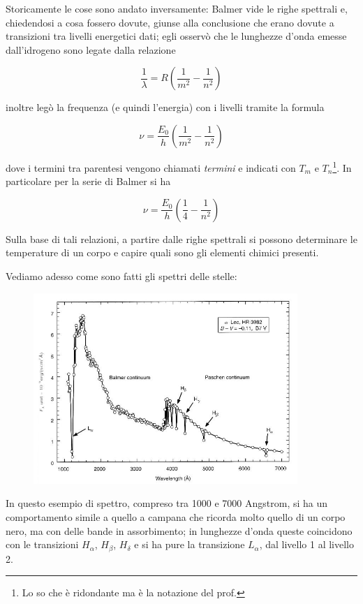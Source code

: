 Storicamente le cose sono andato inversamente: Balmer vide le righe spettrali e, chiedendosi a cosa fossero dovute, giunse alla conclusione che erano dovute a transizioni tra livelli energetici dati; egli osservò che le lunghezze d'onda emesse dall'idrogeno sono legate dalla relazione

$$\frac{1}{\lambda}=R \left( \frac{1}{m^2} - \frac{1}{n^2} \right)$$

inoltre legò la frequenza (e quindi l'energia) con i livelli tramite la formula

$$\nu=\frac{E_0}{h} \left( \frac{1}{m^2} - \frac{1}{n^2} \right)$$

dove i termini tra parentesi vengono chiamati \textit{termini} e indicati con $T_m$ e $T_n$\footnote{Lo so che è ridondante ma è la notazione del prof.}. In particolare per la serie di Balmer si ha

$$\nu=\frac{E_0}{h} \left( \frac{1}{4} - \frac{1}{n^2} \right)$$

Sulla base di tali relazioni, a partire dalle righe spettrali si possono determinare le temperature di un corpo e capire quali sono gli elementi chimici presenti. 

Vediamo adesso come sono fatti gli spettri delle stelle:

\begin{figure}[H]
   \centering
   \includegraphics[width=10cm]{immagini/esempio_spettro_stella.png}
\end{figure}

In questo esempio di spettro, compreso tra 1000 e 7000 Angstrom, si ha un comportamento simile a quello a campana che ricorda molto quello di un corpo nero, ma con delle bande in assorbimento; in lunghezze d'onda queste coincidono con le transizioni $H_\alpha$, $H_\beta$, $H_\delta$ e si ha pure la transizione $L_\alpha$, dal livello 1 al livello 2.


